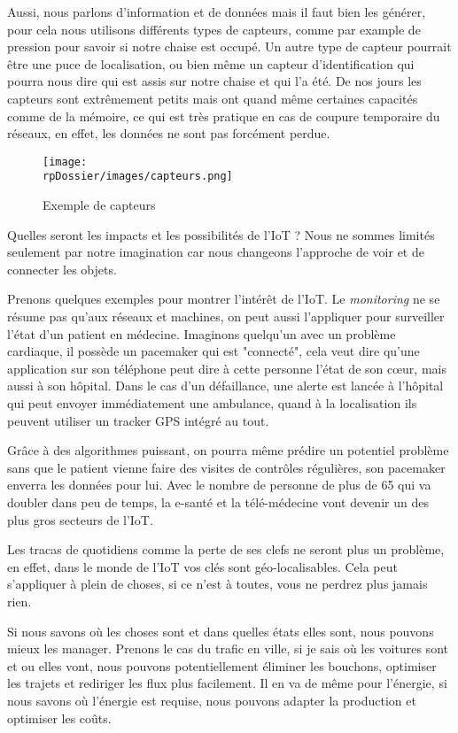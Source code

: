 Aussi, nous parlons d'information et de données mais il faut bien les générer, pour cela nous utilisons différents types de capteurs, comme par example de pression pour savoir si notre chaise est occupé. Un autre type de capteur pourrait être une puce de localisation, ou bien même un capteur d'identification qui pourra nous dire qui est assis sur notre chaise et qui l'a été. De nos jours les capteurs sont extrêmement petits mais ont quand même certaines capacités comme de la mémoire, ce qui est très pratique en cas de coupure temporaire du réseaux, en effet, les données ne sont pas forcément perdue.

\begin{figure}[H]
\begin{center}
\texttt{[image: \\rpDossier/images/capteurs.png]}
\end{center}
\caption{Exemple de capteurs}
\label{conflinphone}
\end{figure}

Quelles seront les impacts et les possibilités de l'IoT ? Nous ne sommes limités seulement par notre imagination car nous changeons l'approche de voir et de connecter les objets.

Prenons quelques exemples pour montrer l'intérêt de l'IoT. Le \textit{monitoring} ne se résume pas qu'aux réseaux et machines, on peut aussi l'appliquer pour surveiller l'état d'un patient en médecine. Imaginons quelqu'un avec un problème cardiaque, il possède un pacemaker qui est "connecté", cela veut dire qu'une application sur son téléphone peut dire à cette personne l'état de son cœur, mais aussi à son hôpital. Dans le cas d'un défaillance, une alerte est lancée à l'hôpital qui peut envoyer immédiatement une ambulance, quand à la localisation ils peuvent utiliser un tracker GPS intégré au tout.

Grâce à des algorithmes puissant, on pourra même prédire un potentiel problème sans que le patient vienne faire des visites de contrôles régulières, son pacemaker enverra les données pour lui. Avec le nombre de personne de plus de 65 qui va doubler dans peu de temps, la e-santé et la télé-médecine vont devenir un des plus gros secteurs de l'IoT. 

Les tracas de quotidiens comme la perte de ses clefs ne seront plus un problème, en effet, dans le monde de l'IoT vos clés sont géo-localisables. Cela peut s'appliquer à plein de choses, si ce n'est à toutes, vous ne perdrez plus jamais rien.

Si nous savons où les choses sont et dans quelles états elles sont, nous pouvons mieux les manager. Prenons le cas du trafic en ville, si je sais où les voitures sont et ou elles vont, nous pouvons potentiellement éliminer les bouchons, optimiser les trajets et rediriger les flux plus facilement. Il en va de même pour l'énergie, si nous savons où l'énergie est requise, nous pouvons adapter la production et optimiser les coûts.

